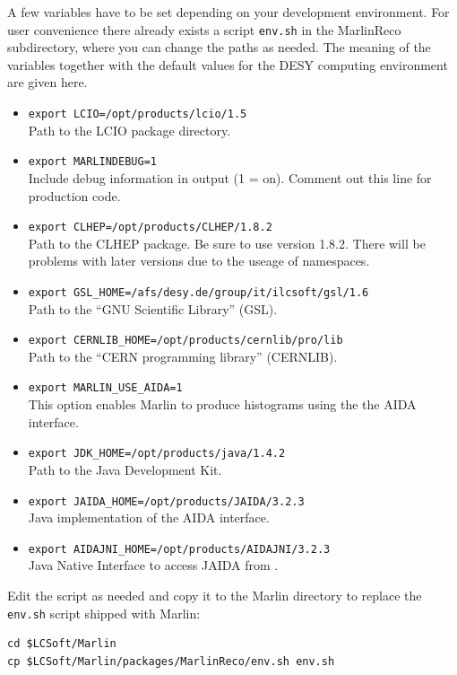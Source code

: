 A few variables have to be set depending on your development
environment. For user convenience there already exists a script
{\tt env.sh} in the MarlinReco subdirectory, where you can change 
the paths as needed. The meaning of the variables together with the 
default values for the DESY computing environment are given here.

\begin{itemize}
\item {\tt export LCIO=/opt/products/lcio/1.5} \\
      Path to the LCIO package directory.
\item {\tt export MARLINDEBUG=1} \\
      Include debug information in output (1 = on). 
      Comment out this line for production code. 
\item {\tt export CLHEP=/opt/products/CLHEP/1.8.2} \\ 
      Path to the CLHEP package. Be sure to use version 1.8.2. 
      There will be problems with later versions due to the useage of 
      namespaces.
\item {\tt export GSL\_HOME=/afs/desy.de/group/it/ilcsoft/gsl/1.6} \\
      Path to the ``GNU Scientific Library'' (GSL).
\item {\tt export CERNLIB\_HOME=/opt/products/cernlib/pro/lib} \\
      Path to the ``CERN programming library'' (CERNLIB).
\item {\tt export MARLIN\_USE\_AIDA=1} \\
      This option enables Marlin to produce histograms using the 
      the AIDA~\cite{ref_aida} interface. 
\item {\tt export JDK\_HOME=/opt/products/java/1.4.2} \\
      Path to the Java Development Kit. 
\item {\tt export JAIDA\_HOME=/opt/products/JAIDA/3.2.3} \\
      Java implementation of the AIDA interface.
\item {\tt export AIDAJNI\_HOME=/opt/products/AIDAJNI/3.2.3} \\
      Java Native Interface to access JAIDA from \CPP{}. 
\end{itemize}

Edit the script as needed and copy it to the Marlin directory to
replace the {\tt env.sh} script shipped with Marlin:

\begin{verbatim}
cd $LCSoft/Marlin 
cp $LCSoft/Marlin/packages/MarlinReco/env.sh env.sh
\end{verbatim}

